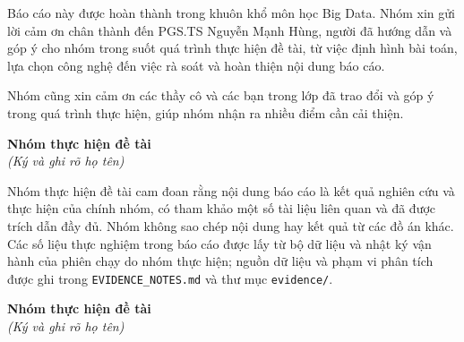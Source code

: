 \documentclass[a4paper,oneside,12pt]{book}
\begin{document}
\coverpage
\cleardoublepage
{}
\pagestyle{empty}

\begin{acknowledgments}
Báo cáo này được hoàn thành trong khuôn khổ môn học Big Data. Nhóm xin gửi
lời cảm ơn chân thành đến PGS.TS Nguyễn Mạnh Hùng, người đã hướng dẫn và
góp ý cho nhóm trong suốt quá trình thực hiện đề tài, từ việc định hình
bài toán, lựa chọn công nghệ đến việc rà soát và hoàn thiện nội dung báo cáo.

Nhóm cũng xin cảm ơn các thầy cô và các bạn trong lớp đã trao đổi và góp ý
trong quá trình thực hiện, giúp nhóm nhận ra nhiều điểm cần cải thiện.

\vspace{1cm}

\begin{flushright}
\textbf{Nhóm thực hiện đề tài}\\
\textit{(Ký và ghi rõ họ tên)}
\end{flushright}

\vspace{2.5cm}
\end{acknowledgments}

\cleardoublepage
\pagestyle{fancy}

\begin{declaration}
Nhóm thực hiện đề tài cam đoan rằng nội dung báo cáo là kết quả nghiên cứu
và thực hiện của chính nhóm, có tham khảo một số tài liệu liên quan và đã
được trích dẫn đầy đủ. Nhóm không sao chép nội dung hay kết quả từ các đồ án
khác. Các số liệu thực nghiệm trong báo cáo được lấy từ bộ dữ liệu và nhật ký
vận hành của phiên chạy do nhóm thực hiện; nguồn dữ liệu và phạm vi phân tích
được ghi trong \texttt{EVIDENCE\_NOTES.md} và thư mục \texttt{evidence/}.

\vspace{1cm}

\begin{flushright}
\textbf{Nhóm thực hiện đề tài}\\
\textit{(Ký và ghi rõ họ tên)}
\end{flushright}

\vspace{2.5cm}
\end{declaration}
\end{document}
